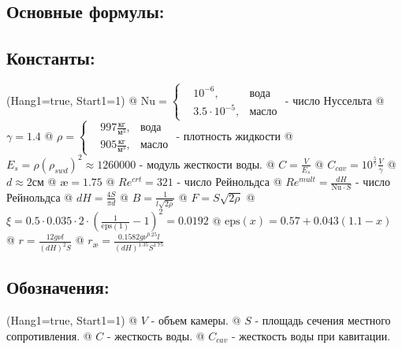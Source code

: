 \documentclass[12pt, a4paper]{article}
\begin{document}
\subsection{Основные формулы:}

\subsection{Константы:}

\noindent\begin{easylist}
\ListProperties(Hang1=true, Start1=1)
@ $ \mathrm{Nu} = \left\{
\begin{aligned}
& 10^{-6},  &\text{вода} \\
& 3.5 \cdot 10^{-5}, &\text{масло}
\end{aligned}
\right. $ - число Нуссельта
@ $ \gamma = 1.4 $
@ $ \rho = \left\{
\begin{aligned}
& 997 \frac{\text{кг}}{\text{м}^3},  &\text{вода} \\
& 905 \frac{\text{кг}}{\text{м}^3}, &\text{масло}
\end{aligned}
\right. $ - плотность жидкости
@ $ E_s = \rho (\rho_{swd})^2 \approx 1260000 $ - модуль жесткости воды.
@ $ C = \frac{V}{E_s} $
@ $ C_{cav} = 10^{\frac5\gamma}\frac{V}{\gamma} $
@ $ d \approx 2 \text{см} $
@ $ \text{\ae} = 1.75 $
@ $ Re^{crt} = 321 $ - число Рейнольдса
@ $ Re^{mult} = \frac{dH}{\mathrm{Nu} \cdot S} $ - число Рейнольдса
@ $ dH = \frac{4S}{\pi d} $
@ $ B = \frac{1}{l\sqrt{2\rho}} $
@ $ F = S\sqrt{2\rho} $
@ $ \xi = 0.5 \cdot 0.035 \cdot 2 \cdot \left(\frac{1}{\mathrm{eps}(1)} - 1\right)^2 = 0.0192 $
@ $ \mathrm{eps}(x) = 0.57 + 0.043(1.1 - x) $
@ $ r = \frac{12g\nu l}{(dH)^2 S} $
@ $ r_\text{\ae} = \frac{0.1582 g \nu^{0.25} l}{(dH)^{1.35} S^{1.75}} $
\end{easylist}


\subsection{Обозначения:}

\noindent\begin{easylist}
\ListProperties(Hang1=true, Start1=1)
@ $ V $ - объем камеры. 
@ $ S $ - площадь сечения местного сопротивления.
@ $ C $ - жесткость воды.
@ $ C_{cav} $ - жесткость воды при кавитации.
\end{easylist}
\end{document}
